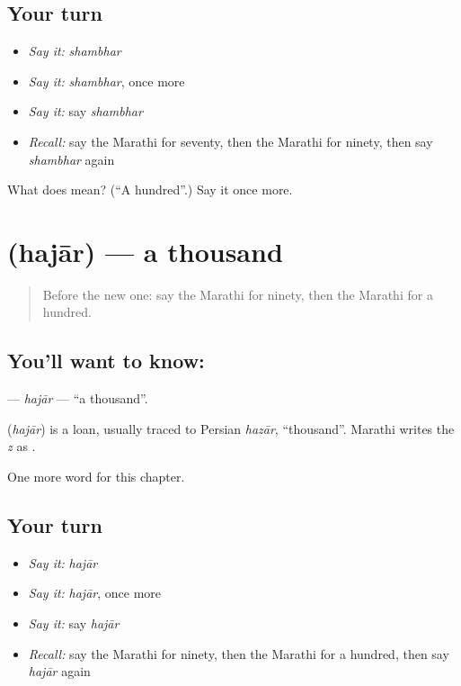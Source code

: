\subsection*{Your turn}
\begin{itemize}
\raggedright
  \item \emph{Say it:} \emph{shambhar}
  \item \emph{Say it:} \emph{shambhar}, once more
  \item \emph{Say it:} say \emph{shambhar}
  \item \emph{Recall:} say the Marathi for seventy, then the Marathi for ninety, then say \emph{shambhar} again
\end{itemize}

\begin{tcolorbox}[breakable,colback=teal!4,colframe=teal!35!black,title={Before you move on}]
What does  mean? (\textquotedblleft{}A hundred\textquotedblright{}.) Say it once more.
\end{tcolorbox}
\section[\texorpdfstring{\mr{हजार} (hajār)}{हजार (hajār)}]{ (hajār) — a thousand}

\label{lesson:MR-C119-hajar}



\begin{quote}
Before the new one: say the Marathi for ninety, then the Marathi for a hundred.
\end{quote}

\subsection*{You'll want to know: }
\textbf{} — \emph{hajār} — \textquotedblleft{}a thousand\textquotedblright{}.

\begin{cousinweb}
\textbf{} (\emph{hajār}) is a loan, usually traced to Persian \emph{hazār}, \textquotedblleft{}thousand\textquotedblright{}. Marathi writes the \emph{z} as \textbf{}.
\end{cousinweb}

\begin{grammarlens}[title={What you've built}]
One more word for this chapter.
\end{grammarlens}

\subsection*{Your turn}
\begin{itemize}
\raggedright
  \item \emph{Say it:} \emph{hajār}
  \item \emph{Say it:} \emph{hajār}, once more
  \item \emph{Say it:} say \emph{hajār}
  \item \emph{Recall:} say the Marathi for ninety, then the Marathi for a hundred, then say \emph{hajār} again
\end{itemize}


